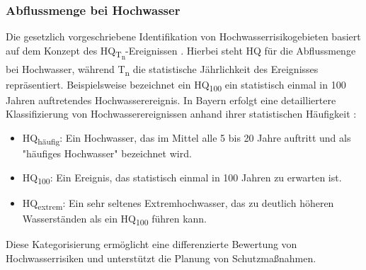 \subsubsection{Abflussmenge bei Hochwasser}\label{sec:HQ}
Die gesetzlich vorgeschriebene Identifikation von Hochwasserrisikogebieten basiert auf dem Konzept des HQ\textsubscript{T\textsubscript{n}}-Ereignissen \autocite{WHG73}. Hierbei steht HQ für die Abflussmenge bei Hochwasser, während T\textsubscript{n} die statistische Jährlichkeit des Ereignisses repräsentiert. Beispielsweise bezeichnet ein HQ\textsubscript{100} ein statistisch einmal in 100 Jahren auftretendes Hochwasserereignis.
In Bayern erfolgt eine detailliertere Klassifizierung von Hochwasserereignissen anhand ihrer statistischen Häufigkeit \autocite{BayLfU2019}:
\begin{itemize}
\item HQ\textsubscript{häufig}: Ein Hochwasser, das im Mittel alle 5 bis 20 Jahre auftritt und als "häufiges Hochwasser" bezeichnet wird.
\item HQ\textsubscript{100}: Ein Ereignis, das statistisch einmal in 100 Jahren zu erwarten ist.
\item HQ\textsubscript{extrem}: Ein sehr seltenes Extremhochwasser, das zu deutlich höheren Wasserständen als ein HQ\textsubscript{100} führen kann.
\end{itemize}
Diese Kategorisierung ermöglicht eine differenzierte Bewertung von Hochwasserrisiken und unterstützt die Planung von Schutzmaßnahmen.
